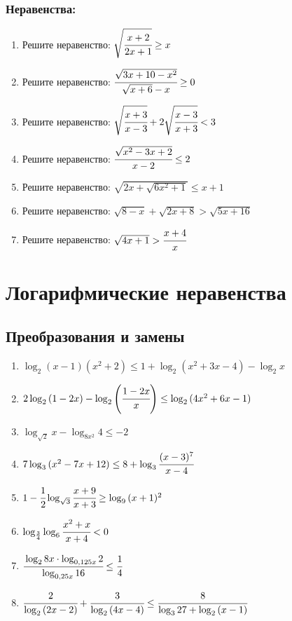 \documentclass[12pt]{article}
\begin{document}
\subsubsection*{Неравенства:}

\begin{enumerate}[start=1,label={\itshape\bfseries \arabic*.}]

\item Решите неравенство: $\sqrt{\cfrac{x + 2}{2x + 1}} \ge x$

\item Решите неравенство: $\cfrac{\sqrt{3x + 10 - x^2}}{\sqrt{x + 6} - x} \ge 0$

\item Решите неравенство: $\sqrt{\cfrac{x + 3}{x - 3}} + 2\sqrt{\cfrac{x - 3}{x + 3}} < 3$

\item Решите неравенство: $\cfrac{\sqrt{x^2 - 3x + 2}}{x - 2} \le 2$

\item Решите неравенство: $\sqrt{2x + \sqrt{6x^2 + 1}} \le x + 1$

\item Решите неравенство: $\sqrt{8 - x} + \sqrt{2x + 8} > \sqrt{5x + 16}$

\item Решите неравенство: $\sqrt{4x + 1} > \cfrac{x + 4}{x}$

\end{enumerate}


\newpage

\section{Логарифмические неравенства}


\subsection{Преобразования и замены}
 \begin{enumerate}[start=1,label={\itshape\bfseries \arabic*.}]
    \item $\log_2{(x - 1)(x^2 + 2)} \le 1 + \log_2{(x^2 + 3x - 4)} - \log_2{x}$
    \item $2\log_2{(1 - 2x) - \log_2\left( \cfrac{1 - 2x}{x} \right)} \le \log_2{(4x^2 + 6x - 1)}$
    \item $\log_{\sqrt{2}}{x} - \log_{8x^2}{4} \le -2$
    \item $7\log_3{(x^2 - 7x + 12)} \le 8 + \log_3{\cfrac{(x - 3)^7}{x - 4}}$
    \item $1 - \cfrac{1}{2}\log_{\sqrt{3}}{\cfrac{x + 9}{x + 3}} \ge \log_9{(x + 1)^2}$
    \item $\log_{\frac{3}{4}}{\log_6{\cfrac{x^2 + x}{x + 4}}} < 0$
    \item $\cfrac{\log_2{8x} \cdot \log_{0,125x}{2}}{\log_{0,25x}{16}} \le \cfrac{1}{4}$
    \item $\cfrac{2}{\log_2{(2x - 2)}} + \cfrac{3}{\log_2{(4x - 4)}} \le \cfrac{8}{\log_3{27} + \log_2{(x - 1)}}$
\end{enumerate}
\end{document}
